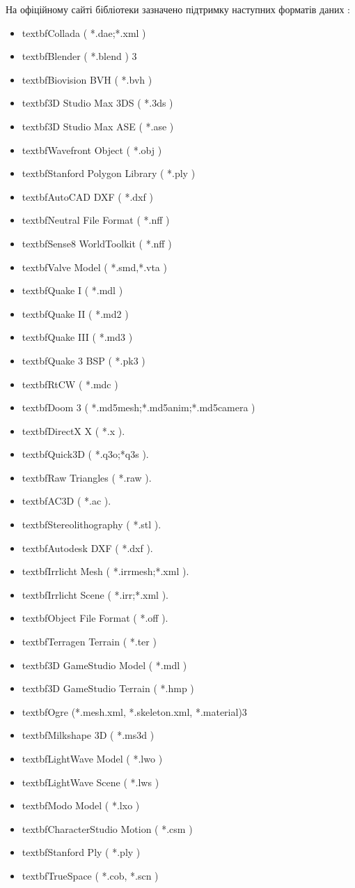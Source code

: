\documentclass[a4paper,12pt]{article}
\begin{document}
На офіційному сайті бібліотеки зазначено підтримку наступних форматів даних \cite{assimp}:
\begin{itemize}
 \item textbf{Collada} ( *.dae;*.xml )
 \item textbf{Blender} ( *.blend ) 3
 \item textbf{Biovision BVH} ( *.bvh )
 \item textbf{3D Studio Max 3DS} ( *.3ds )
 \item textbf{3D Studio Max ASE} ( *.ase )
 \item textbf{Wavefront Object} ( *.obj )
 \item textbf{Stanford Polygon Library} ( *.ply )
 \item textbf{AutoCAD DXF} ( *.dxf )
 \item textbf{Neutral File Format} ( *.nff )
 \item textbf{Sense8 WorldToolkit} ( *.nff )
 \item textbf{Valve Model} ( *.smd,*.vta )
 \item textbf{Quake I} ( *.mdl )
 \item textbf{Quake II} ( *.md2 )
 \item textbf{Quake III} ( *.md3 )
 \item textbf{Quake 3 BSP} ( *.pk3 )
 \item textbf{RtCW} ( *.mdc )
 \item textbf{Doom 3} ( *.md5mesh;*.md5anim;*.md5camera )
 \item textbf{DirectX X} ( *.x ).
 \item textbf{Quick3D} ( *.q3o;*q3s ).
 \item textbf{Raw Triangles} ( *.raw ).
 \item textbf{AC3D} ( *.ac ).
 \item textbf{Stereolithography} ( *.stl ).
 \item textbf{Autodesk DXF} ( *.dxf ).
 \item textbf{Irrlicht Mesh} ( *.irrmesh;*.xml ).
 \item textbf{Irrlicht Scene} ( *.irr;*.xml ).
 \item textbf{Object File Format} ( *.off ).
 \item textbf{Terragen Terrain} ( *.ter )
 \item textbf{3D GameStudio Model} ( *.mdl )
 \item textbf{3D GameStudio Terrain} ( *.hmp )
 \item textbf{Ogre} (*.mesh.xml, *.skeleton.xml, *.material)3
 \item textbf{Milkshape 3D} ( *.ms3d )
 \item textbf{LightWave Model} ( *.lwo )
 \item textbf{LightWave Scene} ( *.lws )
 \item textbf{Modo Model} ( *.lxo )
 \item textbf{CharacterStudio Motion} ( *.csm )
 \item textbf{Stanford Ply} ( *.ply )
 \item textbf{TrueSpace} ( *.cob, *.scn )
\end{itemize}
\end{document}
